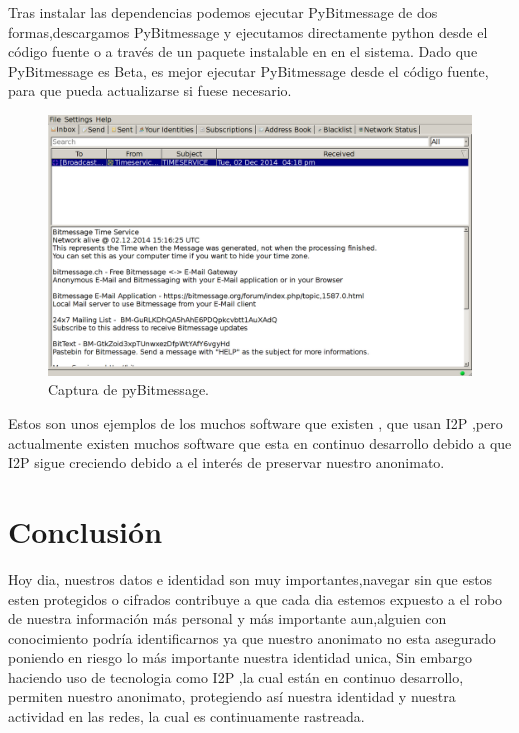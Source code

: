 \documentclass[12]{article}
\begin{document}
Tras instalar las dependencias podemos ejecutar PyBitmessage de dos formas,descargamos PyBitmessage y ejecutamos directamente python desde el código fuente o a través de un paquete 
instalable en en el sistema. Dado que PyBitmessage es Beta, es mejor  ejecutar PyBitmessage desde el código fuente, para que pueda actualizarse si fuese necesario.
\\

\begin{figure}[H]
    \includegraphics[width=1\textwidth]{media/PyBitMessage-client.png}
    \caption{Captura de pyBitmessage.}
    \label{fig5}
\end{figure}

Estos son unos  ejemplos de los muchos software que existen , que usan I2P ,pero actualmente existen muchos software que esta en continuo desarrollo debido a que 
I2P sigue creciendo debido a el interés de preservar nuestro anonimato.

\pagebreak

\section{Conclusión}
Hoy dia, nuestros datos e identidad son muy importantes,navegar sin que estos esten protegidos o cifrados contribuye a que cada dia estemos expuesto
a el robo de  nuestra información más personal y más importante aun,alguien con conocimiento podría identificarnos ya que nuestro anonimato no esta asegurado 
poniendo en riesgo lo más importante nuestra identidad unica, Sin embargo haciendo uso de tecnologia como I2P ,la cual  están en continuo desarrollo,
permiten nuestro anonimato, protegiendo así nuestra identidad y nuestra actividad en las redes, la cual es continuamente rastreada.
\end{document}
